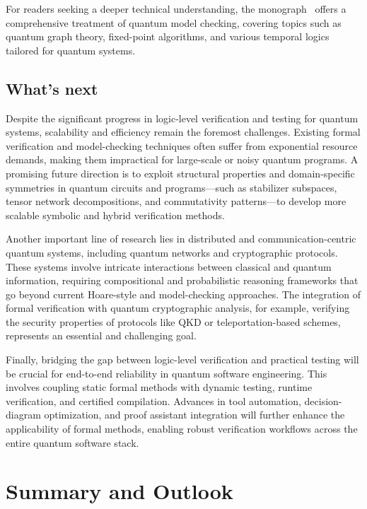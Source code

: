 \documentclass[a4paper,onecolumn,11pt,unpublished]{quantumarticle}
\begin{document}
 For readers seeking a deeper technical understanding, the monograph~\cite{Ying_Feng_2021} offers a comprehensive treatment of quantum model checking, covering topics such as quantum graph theory, fixed-point algorithms, and various temporal logics tailored for quantum systems.
 
 \subsection{What's next}

Despite the significant progress in logic-level verification and testing for quantum systems, scalability and efficiency remain the foremost challenges. Existing formal verification and model-checking techniques often suffer from exponential resource demands, making them impractical for large-scale or noisy quantum programs. A promising future direction is to exploit structural properties and domain-specific symmetries in quantum circuits and programs---such as stabilizer subspaces, tensor network decompositions, and commutativity patterns---to develop more scalable symbolic and hybrid verification methods.

Another important line of research lies in distributed and communication-centric quantum systems, including quantum networks and cryptographic protocols. These systems involve intricate interactions between classical and quantum information, requiring compositional and probabilistic reasoning frameworks that go beyond current Hoare-style and model-checking approaches. The integration of formal verification with quantum cryptographic analysis, for example, verifying the security properties of protocols like QKD or teleportation-based schemes, represents an essential and challenging goal.

Finally, bridging the gap between logic-level verification and practical testing will be crucial for end-to-end reliability in quantum software engineering. This involves coupling static formal methods with dynamic testing, runtime verification, and certified compilation. Advances in tool automation, decision-diagram optimization, and proof assistant integration will further enhance the applicability of formal methods, enabling robust verification workflows across the entire quantum software stack.

\section{Summary and Outlook}
\end{document}
